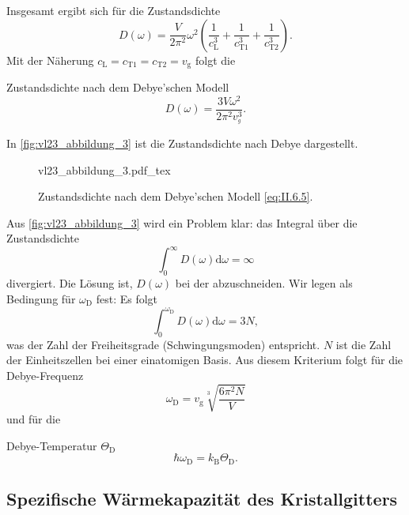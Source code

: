 	Insgesamt ergibt sich für die Zustandsdichte
	$$
	D(\omega) = \frac{V}{2\pi^2} \omega^2 \left( \frac{1}{c_{\mathrm{L}}^3} + \frac{1}{c_{\mathrm{T1}}^3} + \frac{1}{c_{\mathrm{T2}}^3} \right).
	$$ 
	Mit der Näherung $c_{\mathrm{L}} = c_{\mathrm{T1}}= c_{\mathrm{T2}} = v_{\mathrm{g}}$ folgt die
	\begin{important}
		Zustandsdichte nach dem Debye'schen Modell
		\begin{equation}
			\label{eq:II.6.5}
			D(\omega) = \frac{3V \omega^2}{2 \pi^2 v_{^{g}}^3}.
		\end{equation}
	\end{important}
	In \autoref{fig:vl23_abbildung_3} ist die Zustandsdichte nach Debye dargestellt.
	\begin{figure}[H]
		\centering
		\def\svgwidth{.41\columnwidth}
		{vl23_abbildung_3.pdf_tex}
		\caption{Zustandsdichte nach dem Debye'schen Modell \eqref{eq:II.6.5}.}
		\label{fig:vl23_abbildung_3}
	\end{figure}

	Aus \autoref{fig:vl23_abbildung_3} wird ein Problem klar: das Integral über die Zustandsdichte
	$$
	\int_{0}^{\infty} D(\omega) \mathrm{d}\omega = \infty
	$$ 
	divergiert.
	Die Lösung ist, $D(\omega)$ bei der  abzuschneiden.
	Wir legen als Bedingung für $\omega_\mathrm D$ fest:
	Es folgt
	\begin{equation}
		\label{eq:II.6.6}
		\int_{0}^{\omega_\mathrm{D}} D(\omega) \mathrm{d}\omega = 3N,
	\end{equation}
	was der Zahl der Freiheitsgrade (Schwingungsmoden) entspricht. 
	$N$ ist die Zahl der Einheitszellen bei einer einatomigen Basis. 
	Aus diesem Kriterium folgt für die Debye-Frequenz
	\begin{equation}
		\label{eq:II.6.7}
		\omega_\mathrm{D} = v_{\mathrm{g}} \sqrt[3]{ \frac{6\pi^2N}{V}} 
	\end{equation}
	und für die 
	\begin{important}
		Debye-Temperatur $\Theta_\mathrm{D}$ 
		\begin{equation}
			\label{eq:II.6.8}
			\hbar \omega_\mathrm{D} = k_{\mathrm{B}}\Theta_\mathrm{D}.
		\end{equation}
	\end{important}

\subsection{Spezifische Wärmekapazität des Kristallgitters}
